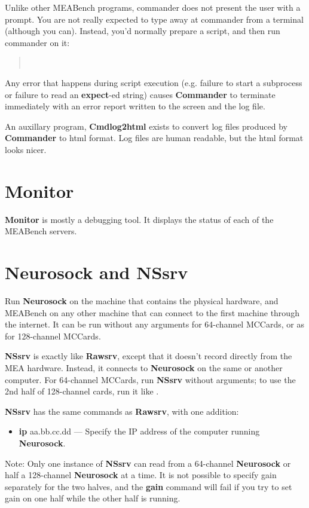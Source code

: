 \documentclass[12pt,oneside]{book}
\def\meabench{{MEABench}\xspace}
\def\prog#1{{\bf #1}}
\def\cmd#1{{\bf #1}}
\begin{document}
Unlike other \meabench programs, commander does not present the user
with a prompt. You are not really expected to type away at commander
from a terminal (although you can). Instead, you'd normally prepare a
script, and then run commander on it:
\begin{quotation}
\uprompt~
\end{quotation}
Any error that happens during script execution (e.g. failure to start
a subprocess or failure to read an \cmd{expect}-ed string) causes
\prog{Commander} to terminate immediately with an error report written
to the screen and the log file.

An auxillary program, \prog{Cmdlog2html} exists to convert log files
produced by \prog{Commander} to html format. Log files are human
readable, but the html format looks nicer.

\section{Monitor}

\prog{Monitor} is mostly a debugging tool. It displays the status of
each of the \meabench servers.

\section{Neurosock and NSsrv}

Run \prog{Neurosock} on the machine that contains the physical
hardware, and \meabench on any other machine that can connect to the
first machine through the internet. It can be run without any
arguments for 64-channel MCCards, or as 
for 128-channel MCCards. 

\prog{NSsrv} is exactly like \prog{Rawsrv}, except that it doesn't 
record directly from the MEA hardware. Instead, it connects to
\prog{Neurosock} on the same or another computer. For 64-channel
MCCards, run \prog{NSsrv} without arguments; to use the 2nd half of
128-channel cards, run it like . 

\prog{NSsrv} has the same commands as \prog{Rawsrv}, with one
addition:
\begin{itemize}
\item \cmd{ip} aa.bb.cc.dd --- Specify the IP address of the computer
running \prog{Neurosock}.
\end{itemize}
Note: Only one instance of \prog{NSsrv} can read from a 64-channel
\prog{Neurosock} or half a 128-channel \prog{Neurosock} at a time. It
is not possible to specify gain separately for the two halves, and the
\cmd{gain} command will fail if you try to set gain on one half while
the other half is running.
\end{document}
